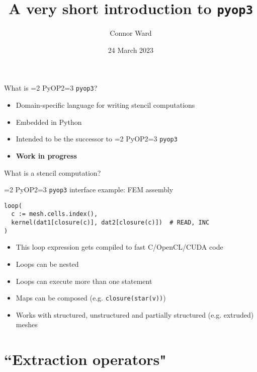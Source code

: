 \documentclass[aspectratio=169]{beamer}
\title{A very short introduction to \texttt{pyop3}}
\author{Connor Ward}
\date{24 March 2023}
\def\pyop#1{\ifnum#1=2 {PyOP2}\else \ifnum#1=3 {\texttt{pyop3}}\fi \fi}
\newcommand{\py}{\texttt}
\begin{document}
\frame{\titlepage}

\begin{frame}{What is \pyop3?}
  \begin{itemize}
    \item Domain-specific language for writing stencil computations
    \item Embedded in Python
    \item Intended to be the successor to \pyop2
    \item \textbf{Work in progress}
  \end{itemize}
\end{frame}

\begin{frame}{What is a stencil computation?}
  \begin{tikzpicture}
    
  \end{tikzpicture}
\end{frame}

\begin{frame}[fragile]{\pyop3 interface example: FEM assembly}
  \begin{tcolorbox}
    \begin{verbatim}
loop(
  c := mesh.cells.index(),
  kernel(dat1[closure(c)], dat2[closure(c)])  # READ, INC
)
    \end{verbatim}
  \end{tcolorbox}

  \begin{itemize}
    \item This loop expression gets compiled to fast C/OpenCL/CUDA code
    \item Loops can be nested
    \item Loops can execute more than one statement
    \item Maps can be composed (e.g. \py{closure(star(v))})
    \item Works with structured, unstructured and partially structured (e.g. extruded) meshes
  \end{itemize}
\end{frame}

\section{``Extraction operators"}

\begin{frame}
  \begin{tikzpicture}
    
  \end{tikzpicture}
\end{frame}
\end{document}
